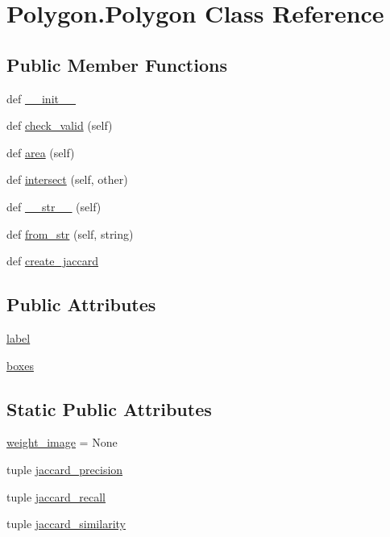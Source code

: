 \hypertarget{class_polygon_1_1_polygon}{}\section{Polygon.\+Polygon Class Reference}
\label{class_polygon_1_1_polygon}
\subsection*{Public Member Functions}
\begin{DoxyCompactItemize}
\item 
def \hyperlink{class_polygon_1_1_polygon_a0597220a1f6014d6651514e4afab3b39}{\+\_\+\+\_\+init\+\_\+\+\_\+}
\item 
def \hyperlink{class_polygon_1_1_polygon_a66c55366671c19f73bc9b8a98f538102}{check\+\_\+valid} (self)
\item 
def \hyperlink{class_polygon_1_1_polygon_a5b6dfe8d9711041f47cac631ddbece48}{area} (self)
\item 
def \hyperlink{class_polygon_1_1_polygon_af5eb0ff19d862839b2507433bf8912a9}{intersect} (self, other)
\item 
def \hyperlink{class_polygon_1_1_polygon_a22e36695384ac61de12a7508fb223ab9}{\+\_\+\+\_\+str\+\_\+\+\_\+} (self)
\item 
def \hyperlink{class_polygon_1_1_polygon_a89bd33b74b0ac5c23f343bfd2e2de720}{from\+\_\+str} (self, string)
\item 
def \hyperlink{class_polygon_1_1_polygon_af1e71ee3388c7cc040541aa9e39420d7}{create\+\_\+jaccard}
\end{DoxyCompactItemize}
\subsection*{Public Attributes}
\begin{DoxyCompactItemize}
\item 
\hyperlink{class_polygon_1_1_polygon_a23c2f3cec7fb964a87c1dae19dbb8180}{label}
\item 
\hyperlink{class_polygon_1_1_polygon_ad22b50b73d0b02bb4cb4078181ad972b}{boxes}
\end{DoxyCompactItemize}
\subsection*{Static Public Attributes}
\begin{DoxyCompactItemize}
\item 
\hyperlink{class_polygon_1_1_polygon_a1e1c90b4131cd111e9841e17bf38da52}{weight\+\_\+image} = None
\item 
tuple \hyperlink{class_polygon_1_1_polygon_a7cd26b002991947f70114fc4f8da73c9}{jaccard\+\_\+precision}
\item 
tuple \hyperlink{class_polygon_1_1_polygon_a342d96bb5b04f0d8c39bf6b7ff5c890b}{jaccard\+\_\+recall}
\item 
tuple \hyperlink{class_polygon_1_1_polygon_aa500070e727a20fec33301308be80778}{jaccard\+\_\+similarity}
\end{DoxyCompactItemize}


